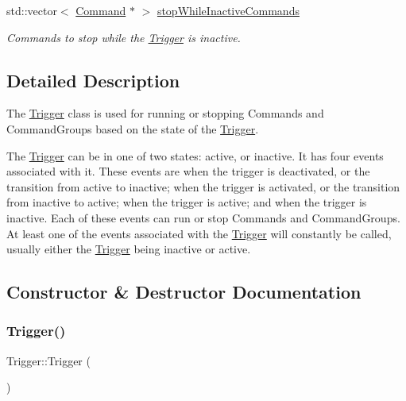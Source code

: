 \begin{DoxyCompactItemize}
\mbox{\label{classlib_iterative_robot_1_1_trigger_ab2ac67a1b851cf8544c253d3ba394c08}} 
std\+::vector$<$ \mbox{\hyperlink{classlib_iterative_robot_1_1_command}{Command}} $\ast$ $>$ \mbox{\hyperlink{classlib_iterative_robot_1_1_trigger_ab2ac67a1b851cf8544c253d3ba394c08}{stop\+While\+Inactive\+Commands}}
\begin{DoxyCompactList}\small\item\em Commands to stop while the \mbox{\hyperlink{classlib_iterative_robot_1_1_trigger}{Trigger}} is inactive. \end{DoxyCompactList}\end{DoxyCompactItemize}


\subsection{Detailed Description}
The \mbox{\hyperlink{classlib_iterative_robot_1_1_trigger}{Trigger}} class is used for running or stopping Commands and Command\+Groups based on the state of the \mbox{\hyperlink{classlib_iterative_robot_1_1_trigger}{Trigger}}.

The \mbox{\hyperlink{classlib_iterative_robot_1_1_trigger}{Trigger}} can be in one of two states\+: active, or inactive. It has four events associated with it. These events are when the trigger is deactivated, or the transition from active to inactive; when the trigger is activated, or the transition from inactive to active; when the trigger is active; and when the trigger is inactive. Each of these events can run or stop Commands and Command\+Groups. At least one of the events associated with the \mbox{\hyperlink{classlib_iterative_robot_1_1_trigger}{Trigger}} will constantly be called, usually either the \mbox{\hyperlink{classlib_iterative_robot_1_1_trigger}{Trigger}} being inactive or active. 

\subsection{Constructor \& Destructor Documentation}
\mbox{\label{classlib_iterative_robot_1_1_trigger_afcf974790b6e846cd89eba5a802e7fa5}} 
\subsubsection{\texorpdfstring{Trigger()}{Trigger()}}
{\footnotesize\ttfamily Trigger\+::\+Trigger (\begin{DoxyParamCaption}{ }\end{DoxyParamCaption})\hspace{0.3cm}{\ttfamily [protected]}}



